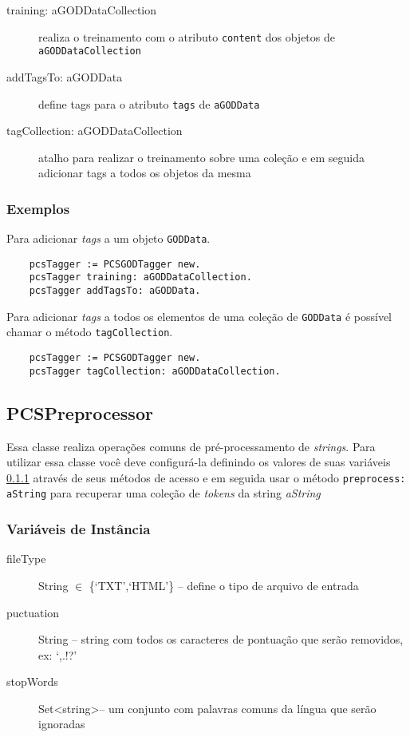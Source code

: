 \begin{description}
    \item [training: aGODDataCollection] realiza o treinamento com o atributo \texttt{content}                                  
                                          dos objetos de \texttt{aGODDataCollection}
    \item [addTagsTo: aGODData] define tags para o atributo \texttt{tags} de \texttt{aGODData}
    \item [tagCollection: aGODDataCollection] atalho para realizar o treinamento sobre uma
                                         coleção e em seguida adicionar tags a todos os objetos
                                         da mesma
 \end{description}


\subsubsection{Exemplos}
    Para adicionar \textit{tags} a um objeto \texttt{GODData}.
    \begin{verbatim}
    pcsTagger := PCSGODTagger new.
    pcsTagger training: aGODDataCollection.
    pcsTagger addTagsTo: aGODData.
    \end{verbatim}
    
    Para adicionar \textit{tags} a todos os elementos de uma coleção de \texttt{GODData} é
    possível chamar o método \texttt{tagCollection}.
    \begin{verbatim}
    pcsTagger := PCSGODTagger new.
    pcsTagger tagCollection: aGODDataCollection.
    \end{verbatim}


\subsection{PCSPreprocessor}
Essa classe realiza operações comuns de pré-processamento de \textit{strings}. 
Para utilizar essa classe você deve configurá-la definindo os valores de suas variáveis 
\ref{pre-variaveis} através de seus métodos de acesso e em seguida usar o método
\texttt{preprocess: aString} para recuperar uma coleção de \textit{tokens} da string 
\textit{aString}


\subsubsection{Variáveis de Instância} \label{pre-variaveis}
\begin{description}
 \item  [fileType] String $\in$ \{`TXT',`HTML'\} -- define o tipo de arquivo de entrada
 \item  [puctuation] String -- string com todos os caracteres de pontuação que  serão removidos,
                     ex: `,.!?'
 \item  [stopWords] Set<string>-- um conjunto com palavras comuns da língua que serão ignoradas 
\end{description}


